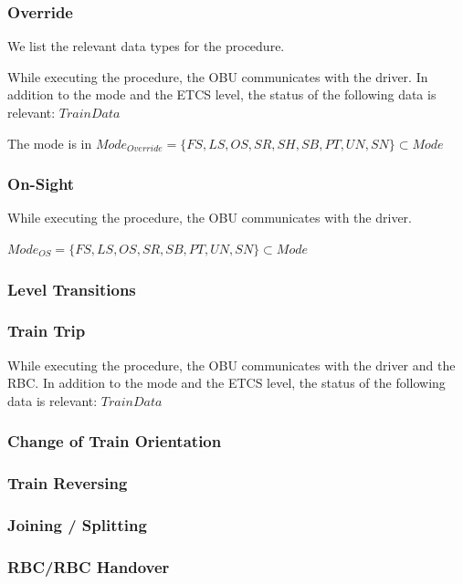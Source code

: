 \documentclass{template/openetcs_article}
\begin{document}
\subsubsection{Override}

We list the relevant data types for the procedure. 

While executing the procedure, the OBU communicates with the driver. In addition to the mode and the ETCS level, the status of the following data is relevant: $\mathit{TrainData}$

The mode is in $\mathit{Mode}_{\mathit{Override}} = \{FS, LS, OS, SR, SH, SB, PT, UN, SN\} \subset\mathit{Mode}$

\subsubsection{On-Sight}

While executing the procedure, the OBU communicates with the driver.

$\mathit{Mode}_{\mathit{OS}} = \{FS, LS, OS, SR, SB, PT, UN, SN\} \subset\mathit{Mode}$

\subsubsection{Level Transitions}

\subsubsection{Train Trip}

While executing the procedure, the OBU communicates with the driver and the RBC. In addition to the mode and the ETCS level, the status of the following data is relevant: $\mathit{TrainData}$

\subsubsection{Change of Train Orientation}

\subsubsection{Train Reversing}

\subsubsection{Joining / Splitting}

\subsubsection{RBC/RBC Handover}
\end{document}
